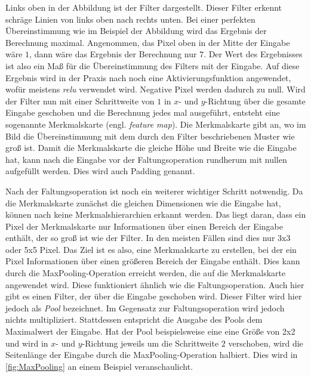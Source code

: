 Links oben in der Abbildung ist der Filter dargestellt.
Dieser Filter erkennt schräge Linien von links oben nach rechts unten.
Bei einer perfekten Übereinstimmung wie im Beispiel der Abbildung wird das Ergebnis der Berechnung maximal.
Angenommen, das Pixel oben in der Mitte der Eingabe wäre $1$, dann wäre das Ergebnis der Berechnung nur $7$.
Der Wert des Ergebnisses ist also ein Maß für die Übereinstimmung des Filters mit der Eingabe.
Auf diese Ergebnis wird in der Praxis nach \cite{6S191CNN} noch eine Aktivierungsfunktion angewendet, wofür meistens \emph{\acrshort{relu}} verwendet wird.
Negative Pixel werden dadurch zu null.
Wird der Filter nun mit einer Schrittweite von $1$ in $x$- und $y$-Richtung über die gesamte Eingabe geschoben und die Berechnung jedes mal ausgeführt, entsteht eine sogenannte Merkmalskarte (engl. \emph{feature map}).
Die Merkmalskarte gibt an, wo im Bild die Übereinstimmung mit dem durch den Filter beschriebenen Muster wie groß ist.
Damit die Merkmalskarte die gleiche Höhe und Breite wie die Eingabe hat, kann nach \cite[S. 168 f.]{DeepLearningPythonKeras} die Eingabe vor der Faltungsoperation rundherum mit nullen aufgefüllt werden.
Dies wird auch Padding genannt.

Nach der Faltungsoperation ist noch ein weiterer wichtiger Schritt notwendig.
Da die Merkmalskarte zunächst die gleichen Dimensionen wie die Eingabe hat, können nach \cite[S. 171]{DeepLearningPythonKeras} keine Merkmalshierarchien erkannt werden.
Das liegt daran, dass ein Pixel der Merkmalskarte nur Informationen über einen Bereich der Eingabe enthält, der so groß ist wie der Filter.
In den meisten Fällen sind dies nur 3x3 oder 5x5 Pixel.
Das Ziel ist es also, eine Merkmalskarte zu erstellen, bei der ein Pixel Informationen über einen größeren Bereich der Eingabe enthält.
Dies kann durch die MaxPooling-Operation erreicht werden, die auf die Merkmalskarte angewendet wird.
Diese funktioniert ähnlich wie die Faltungsoperation.
Auch hier gibt es einen Filter, der über die Eingabe geschoben wird.
Dieser Filter wird hier jedoch als \emph{Pool} bezeichnet.
Im Gegensatz zur Faltungsoperation wird jedoch nichts multipliziert.
Stattdessen entspricht die Ausgabe des Pools dem Maximalwert der Eingabe.
Hat der Pool beispielsweise eine eine Größe von 2x2 und wird in $x$- und $y$-Richtung jeweils um die Schrittweite $2$ verschoben, wird die Seitenlänge der Eingabe durch die MaxPooling-Operation halbiert.
Dies wird in \autoref{fig:MaxPooling} an einem Beispiel veranschaulicht.

